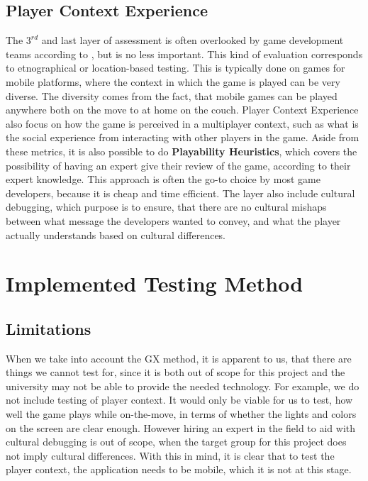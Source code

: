 \subsection{Player Context Experience}
The $3^{rd}$ and last layer of assessment is often overlooked by game development teams according to , but is no less important.
This kind of evaluation corresponds to etnographical or location-based testing.
This is typically done on games for mobile platforms, where the context in which the game is played can be very diverse.
The diversity comes from the fact, that mobile games can be played anywhere both on the move to at home on the couch.
Player Context Experience also focus on how the game is perceived in a multiplayer context, such as what is the social experience from interacting with other players in the game.
Aside from these metrics, it is also possible to do \textbf{Playability Heuristics}, which covers the possibility of having an expert give their review of the game, according to their expert knowledge.
This approach is often the go-to choice by most game developers, because it is cheap and time efficient.
The layer also include cultural debugging, which purpose is to ensure, that there are no cultural mishaps between what message the developers wanted to convey, and what the player actually understands based on cultural differences.

\section{Implemented Testing Method}
\label{sec:test_method}


\subsection{Limitations}

When we take into account the GX method, it is apparent to us, that there are things we cannot test for, since it is both out of scope for this project and the university may not be able to provide the needed technology.
For example, we do not include testing of player context.
It would only be viable for us to test, how well the game plays while on-the-move, in terms of whether the lights and colors on the screen are clear enough.
However hiring an expert in the field to aid with cultural debugging is out of scope, when the target group for this project does not imply cultural differences.
With this in mind, it is clear that to test the player context, the application needs to be mobile, which it is not at this stage.\\

